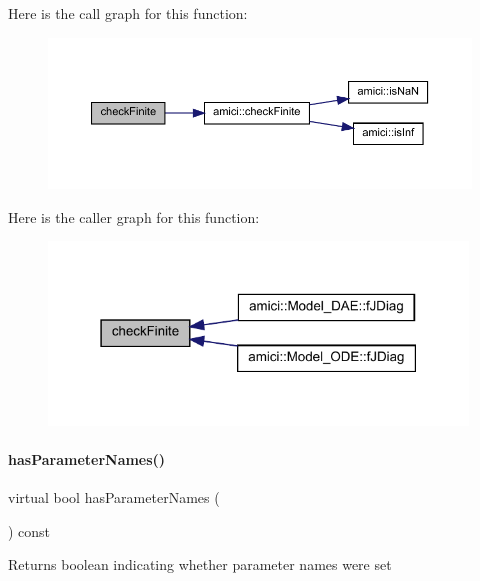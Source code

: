 Here is the call graph for this function\+:
\nopagebreak
\begin{figure}[H]
\begin{center}
\leavevmode
\includegraphics[width=350pt]{classamici_1_1_model_a4c38f5beea9e36aa20a089307edb5fed_cgraph}
\end{center}
\end{figure}
Here is the caller graph for this function\+:
\nopagebreak
\begin{figure}[H]
\begin{center}
\leavevmode
\includegraphics[width=316pt]{classamici_1_1_model_a4c38f5beea9e36aa20a089307edb5fed_icgraph}
\end{center}
\end{figure}
\mbox{\label{classamici_1_1_model_a87eb819581d1ca627e5d5ab35ae8add9}} 
\paragraph{\texorpdfstring{has\+Parameter\+Names()}{hasParameterNames()}}
{\footnotesize\ttfamily virtual bool has\+Parameter\+Names (\begin{DoxyParamCaption}{ }\end{DoxyParamCaption}) const\hspace{0.3cm}{\ttfamily [virtual]}}

\begin{DoxyReturn}{Returns}
boolean indicating whether parameter names were set 
\end{DoxyReturn}


